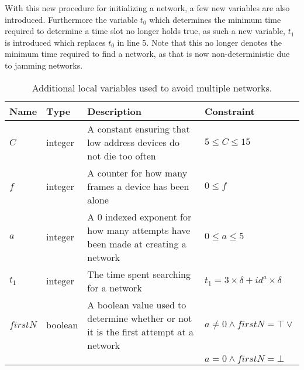With this new procedure for initializing a network, a few new variables are also introduced.
Furthermore the variable $t_0$ which determines the minimum time required to determine a time slot no longer holds true, as such a new variable, $t_1$ is introduced which replaces $t_0$ in  line 5.
Note that this no longer denotes the minimum time required to find a network, as that is now non-deterministic due to jamming networks.
\begin{table}[h]
    {\setlength{\extrarowheight}{1ex}%
    \begin{tabularx}{\textwidth}{l|l|X|l}
        \toprule
        Name                & Type      & Description & Constraint \\
        \midrule
        $C$                 & integer   & A constant ensuring that low address devices do not die too often                 & $5 \leq C \leq 15$      \\
        $f$                 & integer   & A counter for how many frames a device has been alone                             & $0 \leq f$  \\
        $a$                 & integer   & A 0 indexed exponent for how many attempts have been made at creating a network   & $0 \leq a \leq 5$     \\
        $t_1$               & integer   & The time spent searching for a network                                            & $t_1 = 3 \times \delta + id^a \times \delta$     \\
        $firstN$            & boolean   & A boolean value used to determine whether or not it is the first attempt at a network         & $a \neq 0 \land firstN = \top \lor$     \\
                            &           &                                                                                   & $a = 0 \land firstN = \bot$     \\

        \bottomrule
    \end{tabularx}}
    \caption{Additional local variables used to avoid multiple networks.}
    \label{tab:locals_wmulticonnect}
\end{table}